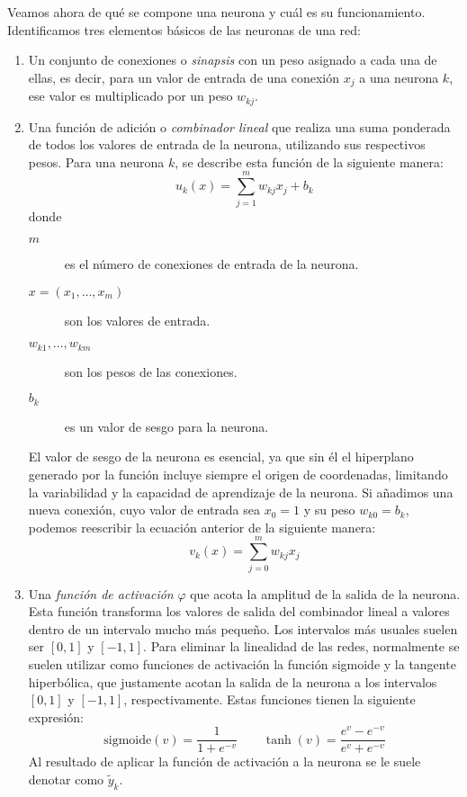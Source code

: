 Veamos ahora de qué se compone una neurona y cuál es su funcionamiento. Identificamos tres elementos básicos de las
neuronas de una red:
\begin{enumerate}
    \item Un conjunto de conexiones o \textit{sinapsis} con un peso asignado a cada una de ellas, es decir, para un
    valor de entrada de una conexión $x_j$ a una neurona $k$, ese valor es multiplicado por un peso $w_{kj}$.
    \item Una función de adición o \textit{combinador lineal} que realiza una suma ponderada de todos los valores de 
    entrada de la neurona, utilizando sus respectivos pesos. Para una neurona $k$, se describe esta función de la
    siguiente manera:
    \begin{equation}\label{eq:neurona}
        u_k(x)=\sum_{j=1}^mw_{kj}x_j+b_k
    \end{equation}
    donde
    \begin{description}
        \item[$m$] es el número de conexiones de entrada de la neurona.
        \item[$x=(x_1,\dots,x_m)$] son los valores de entrada.
        \item[$w_{k1},\dots,w_{km}$] son los pesos de las conexiones.
        \item[$b_k$] es un valor de sesgo para la neurona.
    \end{description}
    El valor de sesgo de la neurona es esencial, ya que sin él el hiperplano generado por la función incluye siempre el
    origen de coordenadas, limitando la variabilidad y la capacidad de aprendizaje de la neurona. Si añadimos una nueva 
    conexión, cuyo valor de entrada sea $x_0=1$ y su peso $w_{k0}=b_k$, podemos reescribir la ecuación anterior de la 
    siguiente manera:
    \begin{equation}
        v_k(x)=\sum_{j=0}^mw_{kj}x_j
    \end{equation}
    \item Una \textit{función de activación} $\varphi$ que acota la amplitud de la salida de la neurona. Esta 
    función transforma los valores de salida del combinador lineal a valores dentro de un intervalo mucho más 
    pequeño. Los intervalos más usuales suelen ser $[0,1]$ y $[-1,1]$. Para eliminar la linealidad de las redes, 
    normalmente se suelen utilizar como funciones de activación la función sigmoide y la tangente hiperbólica, que justamente acotan la salida de la neurona a los intervalos $[0,1]$ y $[-1,1]$, respectivamente. Estas funciones 
    tienen la siguiente expresión:
    \begin{equation}
        \text{sigmoide}(v)=\frac{1}{1+e^{-v}}\quad\quad\tanh(v)=\frac{e^v-e^{-v}}{e^v+e^{-v}}
    \end{equation}
    Al resultado de aplicar la función de activación a la neurona se le suele denotar como $\tilde{y}_k$.
\end{enumerate}

